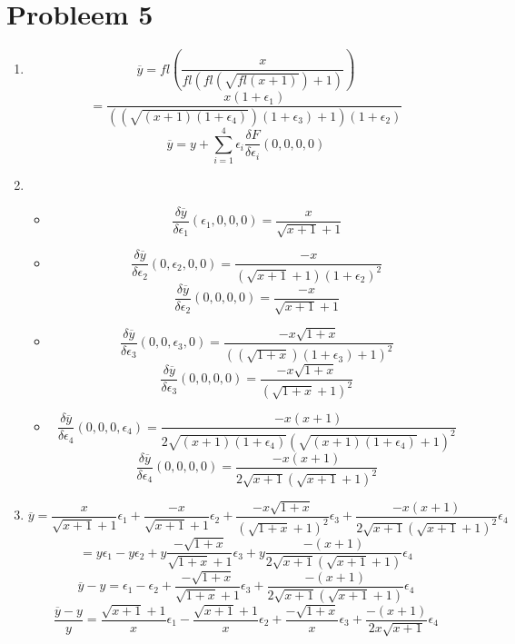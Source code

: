 \documentclass[12pt,a4paper]{article}
\begin{document}
\section{Probleem 5}
\begin{enumerate}
\item
\[
\overline{y} =
fl\left(
\frac{x}{fl\left(fl\left(\sqrt{fl\left(x+1\right)}\right)+1\right)}
\right)
\]
\[
=
\frac{x(1+\epsilon_1)}{\left(\left(\sqrt{\left(x+1\right)(1+\epsilon_4)}\right)(1+\epsilon_3)+1\right)(1+\epsilon_2)}
\]
\[
\overline{y} = y + \sum_{i=1}^4\epsilon_i\frac{\delta F}{\delta\epsilon_i}(0,0,0,0)
\]
\item
\begin{itemize}
\item
\[
\frac{\delta \overline{y}}{\delta \epsilon_1}(\epsilon_1,0,0,0)
= \frac{x}{\sqrt{x+1}+1}
\]
\item
\[
\frac{\delta \overline{y}}{\delta \epsilon_2}(0,\epsilon_2,0,0)
= \frac{-x}{\left(\sqrt{x+1}+1\right)(1+\epsilon_2)^2}
\]
\[
\frac{\delta \overline{y}}{\delta \epsilon_2}(0,0,0,0)
= \frac{-x}{\sqrt{x+1}+1}
\]
\item
\[
\frac{\delta \overline{y}}{\delta \epsilon_3}(0,0,\epsilon_3,0)
= \frac{-x\sqrt{1+x}}{\left((\sqrt{1+x})(1+\epsilon_3)+1\right)^2}
\]
\[
\frac{\delta \overline{y}}{\delta \epsilon_3}(0,0,0,0)
= \frac{-x\sqrt{1+x}}{\left(\sqrt{1+x}+1\right)^2}
\]
\item
\[
\frac{\delta \overline{y}}{\delta \epsilon_4}(0,0,0,\epsilon_4)
= \frac{-x(x+1)}{2\sqrt{(x+1)(1+\epsilon_4)}\left(\sqrt{(x+1)(1+\epsilon_4)}+1\right)^2}
\]
\[
\frac{\delta \overline{y}}{\delta \epsilon_4}(0,0,0,0)
= \frac{-x(x+1)}{2\sqrt{x+1}\left(\sqrt{x+1}+1\right)^2}
\]
\end{itemize}
\item
\[
\overline{y} =
\frac{x}{\sqrt{x+1}+1} \epsilon_1
+
\frac{-x}{\sqrt{x+1}+1} \epsilon_2
+
\frac{-x\sqrt{1+x}}{\left(\sqrt{1+x}+1\right)^2} \epsilon_3
+
\frac{-x(x+1)}{2\sqrt{x+1}\left(\sqrt{x+1}+1\right)^2} \epsilon_4
\]
\[
= 
y \epsilon_1
-
y \epsilon_2
+
y\frac{-\sqrt{1+x}}{\sqrt{1+x}+1} \epsilon_3
+
y
\frac{-(x+1)}{2\sqrt{x+1}\left(\sqrt{x+1}+1\right)} \epsilon_4
\]
\[
\overline{y}-y
= 
\epsilon_1
-
\epsilon_2
+
\frac{-\sqrt{1+x}}{\sqrt{1+x}+1} \epsilon_3
+
\frac{-(x+1)}{2\sqrt{x+1}\left(\sqrt{x+1}+1\right)} \epsilon_4
\]
\[
\frac{\overline{y} - y}{y}
=
\frac{\sqrt{x+1}+1}{x}
\epsilon_1
-
\frac{\sqrt{x+1}+1}{x}
\epsilon_2
+
\frac{-\sqrt{1+x}}{x} \epsilon_3
+
\frac{-(x+1)}{2x\sqrt{x+1}} \epsilon_4
\]
\end{enumerate}
\end{document}
